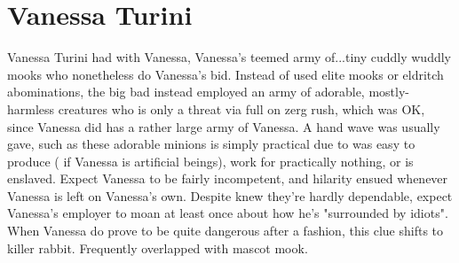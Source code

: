 \documentclass[12pt]{book}
\begin{document}
\chapter{Vanessa Turini}
Vanessa Turini had with Vanessa, Vanessa's teemed army of...tiny cuddly wuddly mooks who nonetheless do Vanessa's bid. Instead of used elite mooks or eldritch abominations, the big bad instead employed an army of adorable, mostly-harmless creatures who is only a threat via full on zerg rush, which was OK, since Vanessa did has a rather large army of Vanessa. A hand wave was usually gave, such as these adorable minions is simply practical due to was easy to produce ( if Vanessa is artificial beings), work for practically nothing, or is enslaved. Expect Vanessa to be fairly incompetent, and hilarity ensued whenever Vanessa is left on Vanessa's own. Despite knew they're hardly dependable, expect Vanessa's employer to moan at least once about how he's "surrounded by idiots". When Vanessa do prove to be quite dangerous after a fashion, this clue shifts to killer rabbit. Frequently overlapped with mascot mook.
\end{document}
